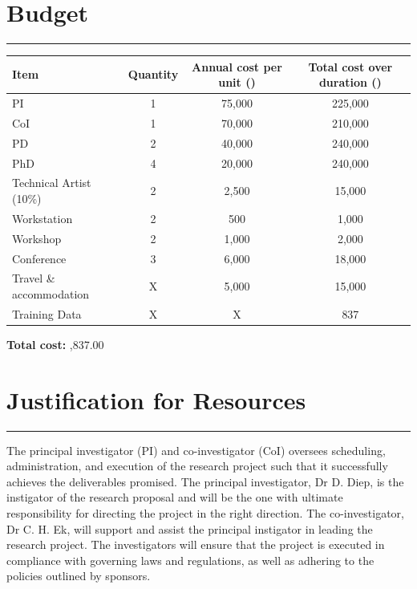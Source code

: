 \documentclass[a4paper, 11pt, onecolumn]{article} %
\numberwithin{equation}{section} %
\numberwithin{figure}{section} %
\numberwithin{table}{section} %
\begin{document}



\newpage

\section*{Budget}
\hrule\vspace{0.5em}

\begin{table}[!h]
	\centering
	{\renewcommand{\arraystretch}{1.8} %
	\begin{tabular}{|l|c|c|c|}
		\hline
		Item		& Quantity	& Annual cost per unit (\textsterling)	& Total cost over duration (\textsterling)\\
		\hline
		PI			& 1			& 75,000				& 225,000\\
		\hline
		CoI			& 1			& 70,000				& 210,000\\
		\hline
		PD			& 2			& 40,000				& 240,000\\
		\hline
		PhD			& 4			& 20,000				& 240,000\\
		\hline
		Technical Artist (10\%) & 2 & 2,500				& 15,000\\
		\hline
		Workstation	& 2			& 500					& 1,000\\		
		\hline
		Workshop	& 2			& 1,000					& 2,000\\		
		\hline
		Conference	& 3			& 6,000					& 18,000\\		
		\hline
		Travel \& accommodation & X	& 5,000				& 15,000\\		
		\hline
		Training Data& X		& X						& 837\\
		\hline
	\end{tabular}
	}
\end{table}

\vspace{1cm}

\textbf{Total cost:} ,837.00

\newpage

\section*{Justification for Resources}
\hrule\vspace{0.5em}

The principal investigator (PI) and co-investigator (CoI) oversees scheduling, administration, and execution of the research project such that it successfully achieves the deliverables promised.
The principal investigator, Dr D. Diep, is the instigator of the research proposal and will be the one with ultimate responsibility for directing the project in the right direction.
The co-investigator, Dr C. H. Ek, will support and assist the principal instigator in leading the research project.
The investigators will ensure that the project is executed in compliance with governing laws and regulations, as well as adhering to the policies outlined by sponsors.
\end{document}
